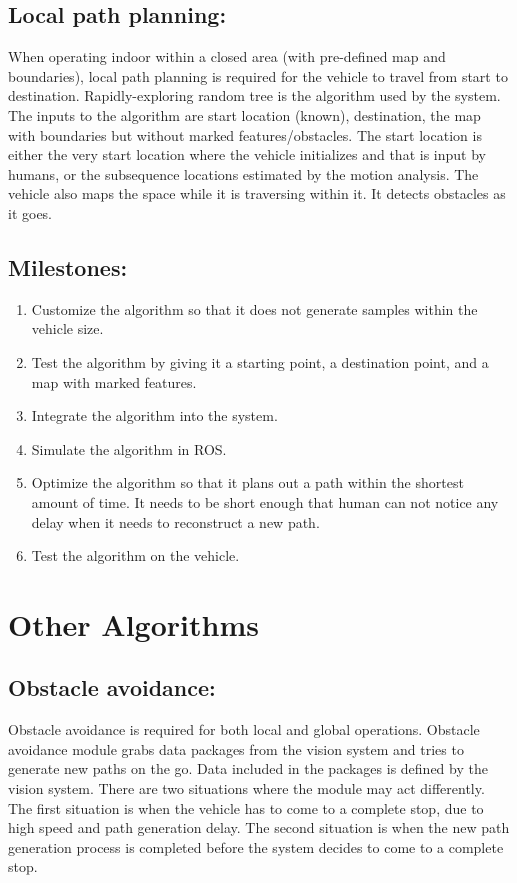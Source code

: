 \documentclass[compsoc,draftclsnofoot,onecolumn,10pt]{IEEEtran}
\begin{document}
\subsection{Local path planning:}
When operating indoor within a closed area (with pre-defined map and boundaries), local path planning is required for the vehicle to travel from start to destination. Rapidly-exploring random tree is the algorithm used by the system. The inputs to the algorithm are start location (known), destination, the map with boundaries but without marked features/obstacles. The start location is either the very start location where the vehicle initializes and that is input by humans, or the subsequence locations estimated by the motion analysis. The vehicle also maps the space while it is traversing within it. It detects obstacles as it goes.\par
\subsection{Milestones:}
\begin{enumerate}
	\item Customize the algorithm so that it does not generate samples within the vehicle size.
	\item Test the algorithm by giving it a starting point, a destination point, and a map with marked features.
	\item Integrate the algorithm into the system.  
	\item Simulate the algorithm in ROS.
	\item Optimize the algorithm so that it plans out a path within the shortest amount of time. It needs to be short enough that human can not notice any delay when it needs to reconstruct a new path.
	\item Test the algorithm on the vehicle.
\end{enumerate}

\section{Other Algorithms}
\subsection{Obstacle avoidance:}
Obstacle avoidance is required for both local and global operations. Obstacle avoidance module grabs data packages from the vision system and tries to generate new paths on the go. Data included in the packages is defined by the vision system. There are two situations where the module may act differently. The first situation is when the vehicle has to come to a complete stop, due to high speed and path generation delay. The second situation is when the new path generation process is completed before the system decides to come to a complete stop.\par
\end{document}
